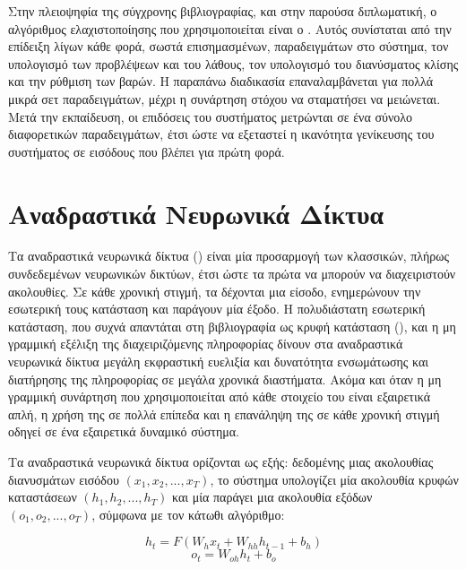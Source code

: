 Στην πλειοψηφία της σύγχρονης βιβλιογραφίας, και στην παρούσα διπλωματική, ο αλγόριθμος ελαχιστοποίησης που χρησιμοποιείται είναι ο .
Αυτός συνίσταται από την επίδειξη λίγων κάθε φορά, σωστά επισημασμένων, παραδειγμάτων στο σύστημα, τον υπολογισμό των προβλέψεων και του λάθους, τον υπολογισμό του διανύσματος κλίσης και την ρύθμιση των βαρών.
Η παραπάνω διαδικασία επαναλαμβάνεται για πολλά μικρά σετ παραδειγμάτων, μέχρι η συνάρτηση στόχου να σταματήσει να μειώνεται.
Μετά την εκπαίδευση, οι επιδόσεις του συστήματος μετρώνται σε ένα σύνολο διαφορετικών παραδειγμάτων, έτσι ώστε να εξεταστεί η ικανότητα γενίκευσης του συστήματος σε εισόδους που βλέπει για πρώτη φορά.
 
\section{Αναδραστικά Νευρωνικά Δίκτυα}

Τα αναδραστικά νευρωνικά δίκτυα () είναι μία προσαρμογή των κλασσικών, πλήρως συνδεδεμένων νευρωνικών δικτύων, έτσι ώστε τα πρώτα να μπορούν να διαχειριστούν ακολουθίες. 
Σε κάθε χρονική στιγμή, τα  δέχονται μια είσοδο, ενημερώνουν την εσωτερική τους κατάσταση και παράγουν μία έξοδο.
Η πολυδιάστατη εσωτερική κατάσταση, που συχνά απαντάται στη βιβλιογραφία ως κρυφή κατάσταση (), και η μη γραμμική εξέλιξη της διαχειριζόμενης πληροφορίας δίνουν στα αναδραστικά νευρωνικά δίκτυα μεγάλη εκφραστική ευελιξία και δυνατότητα ενσωμάτωσης και διατήρησης της πληροφορίας σε μεγάλα χρονικά διαστήματα.
Ακόμα και όταν η μη γραμμική συνάρτηση που χρησιμοποιείται από κάθε στοιχείο του  είναι εξαιρετικά απλή, η χρήση της σε πολλά επίπεδα και η επανάληψη της σε κάθε χρονική στιγμή οδηγεί σε ένα εξαιρετικά δυναμικό σύστημα. 

Τα αναδραστικά νευρωνικά δίκτυα ορίζονται ως εξής: δεδομένης μιας ακολουθίας διανυσμάτων εισόδου $(x_1, x_2, ..., x_T)$, το σύστημα υπολογίζει μία ακολουθία κρυφών καταστάσεων $(h_1, h_2, ..., h_T)$ και μία παράγει μια ακολουθία εξόδων $(ο_1, ο_2, ..., ο_T)$, σύμφωνα με τον κάτωθι αλγόριθμο:


\begin{algorithm}
\caption{}
\begin{algorithmic}
\STATE \begin{equation}
h_t = F(W_h x_t + W_{hh} h_{t-1} + b_h)\label{eq:h}
\end{equation}
\STATE \begin{equation}
o_t = W_{oh} h_t + b_o
\end{equation}
\ENDFOR
\end{algorithmic}
\end{algorithm}

